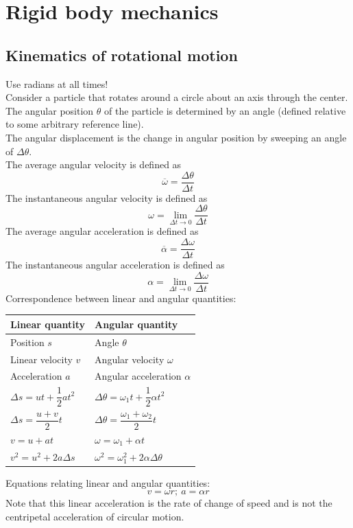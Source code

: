 \documentclass[a4paper,12pt]{article}
\begin{document}
\section{Rigid body mechanics}
\subsection{Kinematics of rotational motion}
Use radians at all times!\\
Consider a particle that rotates around a circle about an axis through the center. The angular position $\theta$ of
the particle is determined by an angle (defined relative to some arbitrary reference line).\\
The angular displacement is the change in angular position by sweeping an angle of $\Delta\theta$.\\
The average angular velocity is defined as
\[\overline{\omega}=\dfrac{\Delta \theta}{\Delta t}\]
The instantaneous angular velocity is defined as
\[\omega=\lim_{\Delta t\to 0}\dfrac{\Delta \theta}{\Delta t}\]
The average angular acceleration is defined as
\[\overline{\alpha}=\dfrac{\Delta\omega}{\Delta t}\]
The instantaneous angular acceleration is defined as
\[\alpha=\lim_{\Delta t\to 0}\dfrac{\Delta\omega}{\Delta t}\]
Correspondence between linear and angular quantities:
\begin{center}
  \renewcommand{\arraystretch}{1.6}
  \begin{tabularx}{\textwidth}{@{}|Y |Y |@{}}
    \toprule
    Linear quantity & Angular quantity \\
    \midrule
    Position $s$ & Angle $\theta$ \\\hline
    Linear velocity $v$ & Angular velocity $\omega$ \\\hline
    Acceleration $a$ & Angular acceleration $\alpha$ \\\hline
    $\Delta s=ut+\dfrac{1}{2}at^2$ & $\Delta \theta=\omega_1t+\dfrac{1}{2}\alpha t^2$\\\hline
    $\Delta s=\dfrac{u+v}{2}t$ & $\Delta \theta=\dfrac{\omega_1+\omega_2}{2}t$\\\hline
    $v=u+at$ & $\omega=\omega_1+\alpha t$\\\hline
    $v^2=u^2+2a\Delta s$ & $\omega^2=\omega_1^2+2\alpha\Delta\theta$\\
    \bottomrule
  \end{tabularx}
\end{center}
Equations relating linear and angular quantities:
\[v=\omega r;\ a=\alpha r\]
Note that this linear acceleration is the rate of change of speed and is not the centripetal acceleration of circular motion.
\end{document}
